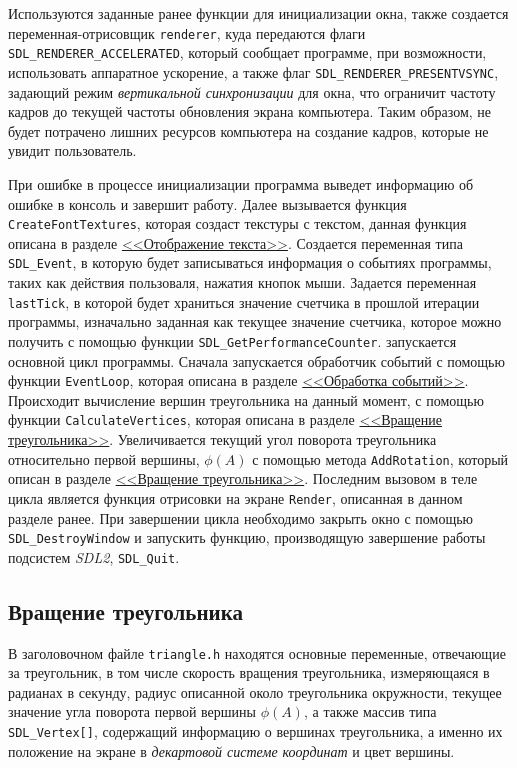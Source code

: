 \documentclass[14pt]{extarticle}
\begin{document}
{    \begin{spacing}{1.5}
        Используются заданные ранее функции для инициализации окна, также создается переменная-отрисовщик \verb|renderer|, куда передаются флаги \verb|SDL_RENDERER_ACCELERATED|, который сообщает программе, при возможности, использовать аппаратное ускорение, а также флаг \verb|SDL_RENDERER_PRESENTVSYNC|, задающий режим \textit{вертикальной синхронизации} для окна, что ограничит частоту кадров до текущей частоты обновления экрана компьютера. Таким образом, не будет потрачено лишних ресурсов компьютера на создание кадров, которые не увидит пользователь.
        \par
        При ошибке в процессе инициализации программа выведет информацию об ошибке в консоль и завершит работу. Далее вызывается функция \verb|CreateFontTextures|, которая создаст текстуры с текстом, данная функция описана в разделе \hyperref[sec:createfonts]{<<Отображение текста>>}. Создается переменная типа \verb|SDL_Event|, в которую будет записываться информация о событиях программы, таких как действия пользоваля, нажатия кнопок мыши. Задается переменная \verb|lastTick|, в которой будет храниться значение счетчика в прошлой итерации программы, изначально заданная как текущее значение счетчика, которое можно получить с помощью функции \verb|SDL_GetPerformanceCounter|.  запускается основной цикл программы. Сначала запускается обработчик событий с помощью функции \verb|EventLoop|, которая описана в разделе \hyperref[sec:eventloop]{<<Обработка событий>>}. Происходит вычисление вершин треугольника на данный момент, с помощью функции \verb|CalculateVertices|, которая описана в разделе \hyperref[sec:calcverts]{<<Вращение треугольника>>}. Увеличивается текущий угол поворота треугольника относительно первой вершины, $\phi(A)$ с помощью метода \verb|AddRotation|, который описан в разделе \hyperref[sec:addrotation]{<<Вращение треугольника>>}. Последним вызовом в теле цикла является функция отрисовки на экране \verb|Render|, описанная в данном разделе ранее. При завершении цикла необходимо закрыть окно с помощью \verb|SDL_DestroyWindow| и запускить функцию, производящую завершение работы подсистем \textit{SDL2}, \verb|SDL_Quit|.
    \end{spacing}
    {
        \par
        \subsection{Вращение треугольника}
        \label{sec:triangle}
        \par
    }
    \begin{spacing}{1.5}
        В заголовочном файле \verb|triangle.h| находятся основные переменные, отвечающие за треугольник, в том числе скорость вращения треугольника, измеряющаяся в радианах в секунду, радиус описанной около треугольника окружности, текущее значение угла поворота первой вершины $\phi(A)$, а также массив типа \verb|SDL_Vertex[]|, содержащий информацию о вершинах треугольника, а именно их положение на экране в \textit{декартовой системе координат} и цвет вершины.
    \end{spacing}

}
\end{document}
